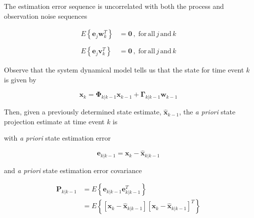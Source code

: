 \documentclass[12pt]{article}
\begin{document}
The estimation error sequence is uncorrelated with both the process and observation noise sequences

\begin{equation*}
    \begin{aligned}
        E \left\{ \mathbf{e}_j \mathbf{w}_k^T \right\} &= \mathbf{0} \, , \phantom{.} \mathrm{for} \, \mathrm{all} \, j \, \mathrm{and} \, k \\
        \phantom{.} \\
        E \left\{ \mathbf{e}_j \mathbf{v}_k^T \right\} &= \mathbf{0} \, , \phantom{.} \mathrm{for} \, \mathrm{all} \, j \, \mathrm{and} \, k
    \end{aligned}
\end{equation*}

Observe that the system dynamical model tells us that the state for time event $k$ is given by

\begin{equation*}
    \mathbf{x}_{k} = \mathbf{\Phi}_{k|k-1} \mathbf{x}_{k-1} + \mathbf{\Gamma}_{k|k-1} \mathbf{w}_{k-1}
\end{equation*}

Then, given a previously determined state estimate, $\hat{\mathbf{x}}_{k-1}$, the
\textit{a priori} state projection estimate at time event $k$ is


with \textit{a priori} state estimation error

\begin{equation*}
    \mathbf{e}_{k|k-1} = \mathbf{x}_{k} - \hat{\mathbf{x}}_{k|k-1}
\end{equation*}

and \textit{a priori} state estimation error covariance

\begin{equation*}
    \begin{aligned}
        \mathbf{P}_{k|k-1} &= E \left\{ \mathbf{e}_{k|k-1} \mathbf{e}_{k|k-1}^T \right\} \\
        &= E \left\{ \left[ \mathbf{x}_{k} - \hat{\mathbf{x}}_{k|k-1} \right] \left[ \mathbf{x}_{k} - \hat{\mathbf{x}}_{k|k-1} \right]^T \right\}
    \end{aligned}
\end{equation*}
\end{document}
